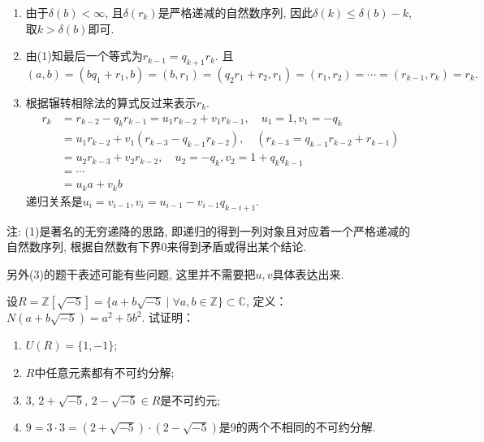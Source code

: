 \begin{solution}
\begin{enumerate}[(1)]
    \item 由于$\delta(b) < \infty$, 且$\delta(r_k)$是严格递减的自然数序列, 因此$\delta(k) \leqslant \delta(b) - k$, 取$k > \delta(b)$即可.
    \item 由(1)知最后一个等式为$r_{k - 1} = q_{k + 1}r_{k}$. 且
\[
    (a, b) = (bq_1 + r_1, b) = (b, r_1) = (q_2r_1 + r_2, r_1) = (r_1, r_2) = \cdots = (r_{k - 1}, r_k) = r_k.
\]
    \item 根据辗转相除法的算式反过来表示$r_k$.
\[
    \begin{aligned}
        r_k &= r_{k - 2} - q_kr_{k - 1} = u_1r_{k - 2} + v_1r_{k - 1},\quad u_1 = 1, v_1 = -q_k\\ 
        &= u_1r_{k - 2} + v_1(r_{k - 3} - q_{k - 1}r_{k - 2}),\quad (r_{k - 3} = q_{k - 1}r_{k - 2} + r_{k - 1})\\
        &= u_2r_{k - 3} + v_2r_{k - 2}, \quad u_2 = -q_k, v_2 = 1 + q_kq_{k - 1}\\
        &= \cdots \\
        &= u_ka + v_kb 
    \end{aligned}
\]
递归关系是$u_i = v_{i - 1}, v_i = u_{i - 1} - v_{i - 1}q_{k - i + 1}$.
\end{enumerate}
注: (1)是著名的无穷递降的思路, 即递归的得到一列对象且对应着一个严格递减的自然数序列, 根据自然数有下界$0$来得到矛盾或得出某个结论.

    另外(3)的题干表述可能有些问题, 这里并不需要把$u, v$具体表达出来.
\end{solution}

\begin{problem}
    设$R = \mathbb{Z}[\sqrt{-5}] = \{a + b\sqrt{-5} \mid \forall a, b \in\mathbb{Z}\} \subset \mathbb{C}$,
定义：$N(a + b\sqrt{-5}) = a^2 + 5b^2$. 试证明：
\begin{enumerate}[(1)]
    \item $U(R) = \{1, -1\}$;
    \item $R$中任意元素都有不可约分解;
    \item $3$, $2 + \sqrt{-5}$, $2 - \sqrt{-5} \in R$是不可约元;
    \item $9 = 3 \cdot 3= (2 + \sqrt{-5}) \cdot (2 - \sqrt{-5})$是$9$的两个不相同的不可约分解.
\end{enumerate}
\end{problem}

